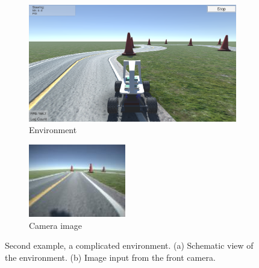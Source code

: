 \documentclass{article} %
\begin{document}
\begin{figure}[ht]
\centering
\begin{subfigure}[b]{0.45\textwidth}
\centering
\includegraphics[width=\textwidth]{fig6a_complex_env.png}
\caption{Environment}
\label{fig:gull}
\end{subfigure}%
\begin{subfigure}[b]{0.34\textwidth}
\centering
\includegraphics[width=\textwidth]{fig6b_camera.jpg}
\caption{Camera image}
\label{fig:gull}
\end{subfigure}%
\caption{Second example, a complicated environment. (a) Schematic view of the environment. (b) Image input from the front camera.}
\end{figure}
\end{document}
